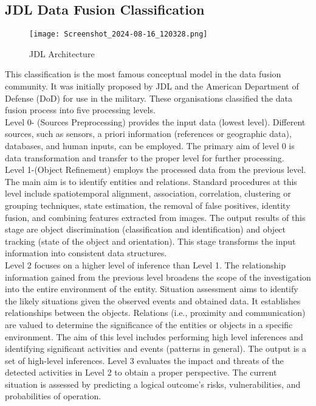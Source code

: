 \subsection{JDL Data Fusion Classification}
\begin{figure}[htpb]  %
   \centering
    \texttt{[image: Screenshot\_2024-08-16\_120328.png]}  %
    \caption{JDL Architecture}
    \label{fig:datafusionclassification}
\end{figure}
This classification is the most famous conceptual model in the data fusion community. It was initially proposed by JDL and the American Department of Defense (DoD) for use in the military. These organisations classified the data fusion process into five processing levels.\\ 
Level 0- (Sources Preprocessing) provides the input data (lowest level). Different sources, such as sensors, a priori information (references or geographic data), databases, and human inputs, can be employed. The primary aim of level 0 is data transformation and transfer to the proper level for further processing.\\ 
Level 1-(Object Refinement) employs the processed data from the previous level. The main aim is to identify entities and relations. Standard procedures at this level include spatiotemporal alignment, association, correlation, clustering or grouping techniques, state estimation, the removal of false positives, identity fusion, and combining features extracted from images. The output results of this stage are object discrimination (classification and identification) and object tracking (state of the object and orientation). This stage transforms the input information into consistent data structures.\\
Level 2 focuses on a higher level of inference than Level 1. The relationship information gained from the previous level broadens the scope of the investigation into the entire environment of the entity. Situation assessment aims to identify the likely situations given the observed events and obtained data. It establishes relationships between the objects. Relations (i.e., proximity and communication) are valued to determine the significance of the entities or objects in a specific environment. The aim of this level includes performing high level inferences and identifying significant activities and events (patterns in general). The output is a set of high-level inferences.     
Level 3 evaluates the impact and threats of the detected activities in Level 2 to obtain a proper perspective. The current situation is assessed by predicting a logical outcome's risks, vulnerabilities, and probabilities of operation. 
